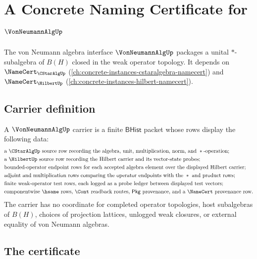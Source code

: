 \chapter{A Concrete Naming Certificate for $\VonNeumannAlgUp$}
\label{ch:concrete-instances-vonneumannalgebra-namecert}

The von Neumann algebra interface $\VonNeumannAlgUp$ packages a unital $*$-subalgebra of $B(H)$ closed in the weak operator topology. It depends on $\NameCert_{\CStarAlgUp}$ (\autoref{ch:concrete-instances-cstaralgebra-namecert}) and $\NameCert_{\HilbertUp}$ (\autoref{ch:concrete-instances-hilbert-namecert}).

\section{Carrier definition}
\label{sec:vonneumannalgebra-carrier}

\begin{definition}\label{def:vonneumannalgebra-bhist-carrier}
A $\VonNeumannAlgUp$ carrier is a finite $\mathsf{BHist}$ packet whose rows display the following data:
$$
\begin{aligned}
&\text{a }\CStarAlgUp\text{ source row recording the algebra, unit, multiplication, norm, and }*\text{-operation;}\\
&\text{a }\HilbertUp\text{ source row recording the Hilbert carrier and its vector-state probes;}\\
&\text{bounded-operator endpoint rows for each accepted algebra element over the displayed Hilbert carrier;}\\
&\text{adjoint and multiplication rows comparing the operator endpoints with the }*\text{ and product rows;}\\
&\text{finite weak-operator test rows, each logged as a probe ledger between displayed test vectors;}\\
&\text{componentwise }\hsame\text{ rows, }\Cont\text{ readback routes, }\mathsf{Pkg}\text{ provenance, and a }\NameCert\text{ provenance row.}
\end{aligned}
$$
The carrier has no coordinate for completed operator topologies, host subalgebras of $B(H)$, choices of projection lattices, unlogged weak closures, or external equality of von Neumann algebras.
\end{definition}

\section{The certificate}
\label{sec:vonneumannalgebra-certificate}

